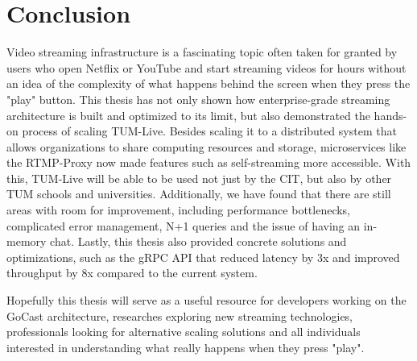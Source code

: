 
\chapter{Conclusion}\label{chapter:conclusion}

Video streaming infrastructure is a fascinating topic often taken for granted by users who open Netflix or YouTube and start streaming videos for hours without an idea of the complexity of what happens behind the screen when they press the "play" button. This thesis has not only shown how enterprise-grade streaming architecture is built and optimized to its limit, but also demonstrated the hands-on process of scaling TUM-Live. Besides scaling it to a distributed system that allows organizations to share computing resources and storage, microservices like the RTMP-Proxy now made features such as self-streaming more accessible. With this, TUM-Live will be able to be used not just by the \ac{CIT}, but also by other \ac{TUM} schools and universities.
Additionally, we have found that there are still areas with room for improvement, including performance bottlenecks, complicated error management, N+1 queries and the issue of having an in-memory chat. Lastly, this thesis also provided concrete solutions and optimizations, such as the \ac{gRPC} \ac{API} that reduced latency by 3x and improved throughput by 8x compared to the current system. 

Hopefully this thesis will serve as a useful resource for developers working on the GoCast architecture, researches exploring new streaming technologies, professionals looking for alternative scaling solutions and all individuals interested in understanding what really happens when they press "play".
